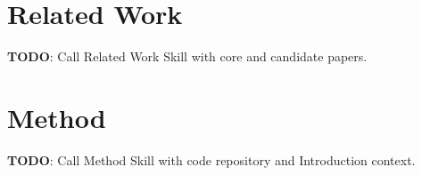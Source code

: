 \documentclass{article}
\begin{document}
\section{Related Work}
\label{sec:related}

%
%

\textbf{TODO}: Call Related Work Skill with core and candidate papers.

\section{Method}
\label{sec:method}


\textbf{TODO}: Call Method Skill with code repository and Introduction context.
\end{document}
